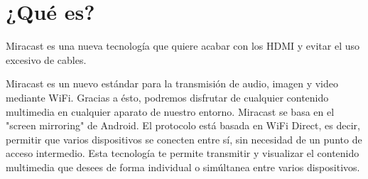 \section{¿Qué es?}

Miracast es una nueva tecnología que quiere acabar con los HDMI y evitar el uso excesivo de cables.

Miracast es un nuevo estándar para la transmisión de audio, imagen y video mediante WiFi. Gracias a ésto, podremos disfrutar de cualquier contenido multimedia en cualquier aparato de nuestro entorno.  Miracast se basa en el "screen mirroring" de Android.  El protocolo está basada en WiFi Direct, es decir, permitir que varios dispositivos se conecten entre sí, sin necesidad de un punto de acceso intermedio. Esta tecnología te permite transmitir y visualizar el contenido multimedia que desees de forma individual o simúltanea entre varios dispositivos.


